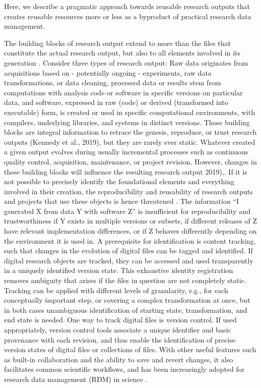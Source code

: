 Here, we describe a pragmatic approach towards reusable research outputs that creates reusable resources more or less as a byproduct of practical research data management.

The building blocks of research output extend to more than the files that constitute the actual research output, but also to all elements involved in its generation \citep{claerbout1992electronic}.
Consider three types of research output: Raw data originates from acquisitions based on - potentially ongoing - experiments, raw data transformations, or data cleaning, processed data or results stem from computations with analysis code or software in specific versions on particular data, and software, expressed in raw (code) or derived (transformed into executable) form, is created or used in specific computational environments, with compilers, underlying libraries, and systems in distinct versions.
Those building blocks are integral information to retrace the genesis, reproduce, or trust research outputs (Kennedy et al., 2019), but they are rarely ever static.
Whatever created a given output evolves during usually incremental processes such as continuous quality control, acquisition, maintenance, or project revision.
However, changes in these building blocks will influence the resulting research output \citep{kennedy2019everything} 2019),\citep{glatard2015reproducibility}.
If it is not possible to precisely identify the foundational elements and everything involved in their creation, the reproducibility and reusability of research outputs and projects that use these objects is hence threatened \citep{kennedy2019everything}.
The information “I generated X from data Y with software Z” is insufficient for reproducibility and trustworthiness if Y exists in multiple versions or subsets, if different releases of Z have relevant implementation differences, or if Z behaves differently depending on the environment it is used in.
A prerequisite for identification is content tracking, such that changes in the evolution of digital files can be tagged and identified. If digital research objects are tracked, they can be accessed and used transparently in a uniquely identified version state.
This exhaustive identity registration removes ambiguity that arises if the files in question are not completely static.
Tracking can be applied with different levels of granularity, e.g., for each conceptually important step, or covering a complex transformation at once, but in both cases unambiguous identification of starting state, transformation, and end state is needed.
One way to track digital files is version control. If used appropriately, version control tools associate a unique identifier and basic provenance with each revision, and thus enable the identification of precise version states of digital files or collections of files. With other useful features such as built-in collaboration and the ability to save and revert changes, it also facilitates common scientific workflows, and has been increasingly adopted for research data management (RDM) in science \citep{nord2019towards} \citep{strupler2017reproducibility} \citep{bryan2018excuse} \citep{corti2019managing}.
